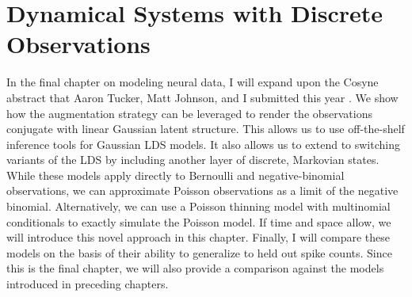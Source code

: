 \chapter{Dynamical Systems with Discrete Observations}

In the final chapter on modeling neural data, I will expand upon the 
Cosyne abstract that Aaron Tucker, Matt Johnson, and I submitted this 
year \cite{linderman2016cosyne}. 
We show how the \polyagamma augmentation strategy can be leveraged 
to render the observations conjugate with linear Gaussian latent structure. 
This allows us to use off-the-shelf inference tools for Gaussian LDS 
models. It also allows us to extend to switching variants of the LDS 
by including another layer of discrete, Markovian states. 
While these models apply directly to Bernoulli and negative-binomial 
observations, we can approximate Poisson observations as a limit of the 
negative binomial. Alternatively, we can use a Poisson thinning model with 
multinomial conditionals to exactly simulate the Poisson model. If time 
and space allow, we will introduce this novel approach in this chapter.
Finally, I will compare these models on the basis of their ability to generalize to 
held out spike counts. Since this is the final chapter, we will also 
provide a comparison against the models introduced in preceding chapters.
